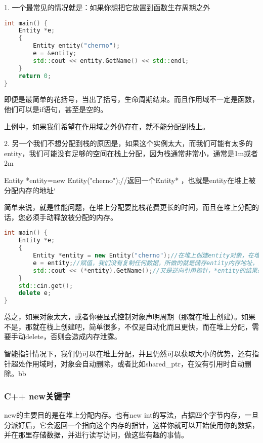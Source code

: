 1. 一个最常见的情况就是：如果你想把它放置到函数生存周期之外


\begin{lstlisting}[language=c++]
int main() {
    Entity *e;
    {
        Entity entity("cherno");
        e = &entity;
        std::cout << entity.GetName() << std::endl;
    }
    return 0;
}
\end{lstlisting}

即便是最简单的花括号，当出了括号，生命周期结束。而且作用域不一定是函数，他们可以是{\ncodestyle if}语句，甚至是空的。

上例中，如果我们希望在作用域之外仍存在，就不能分配到栈上。

2. 另一个我们不想分配到栈的原因是，如果这个实例太大，而我们可能有太多的entity，我们可能没有足够的空间在栈上分配，因为栈通常非常小，通常是{\ncodestyle 1m}或者{\ncodestyle 2m}

{\ncodestyle Entity *entity=new Entity("cherno");//返回一个Entity* ，也就是entity在堆上被分配内存的地址`}

简单来说，就是性能问题，在堆上分配要比栈花费更长的时间，而且在堆上分配的话，您必须手动释放被分配的内存。


\begin{lstlisting}[language=c++]
int main() {
    Entity *e;
    {
        Entity *entity = new Entity("cherno");//在堆上创建entity对象，在堆上
        e = entity;//赋值，我们没有复制任何数据，所做的就是储存entity内存地址，当复制entity对象时，只复制地址
        std::cout << (*entity).GetName();//又是逆向引用指针，*entity的结果是entity对象，也可以这么写entity->GetName()
    }
    std::cin.get();
    delete e;
}
\end{lstlisting}


总之，如果对象太大，或者你要显式控制对象声明周期（那就在堆上创建）。如果不是，那就在栈上创建吧，简单很多，不仅是自动化而且更快，而在堆上分配，需要手动{\ncodestyle delete}，否则会造成内存泄露。


智能指针情况下，我们仍可以在堆上分配，并且仍然可以获取大小的优势，还有指针超处作用域时，对象会自动删除，或者比如{\ncodestyle shared_ptr}，在没有引用时自动删除。bb

\subsubsection{C++ new关键字}

{\ncodestyle new}的主要目的是在堆上分配内存。也有{\ncodestyle new int}的写法，占据四个字节内存，一旦分派好后，它会返回一个指向这个内存的指针，这样你就可以开始使用你的数据，并在那里存储数据，并进行读写访问，做这些有趣的事情。

